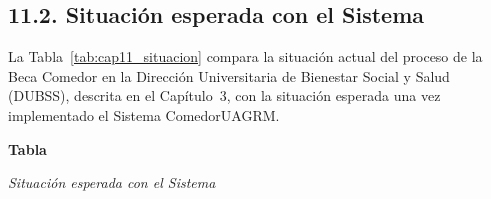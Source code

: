\subsection{11.2. Situación esperada con el Sistema}\label{sec:cap11_situacion}

La Tabla~\ref{tab:cap11_situacion} compara la situación actual del proceso de la Beca Comedor en la Dirección Universitaria de Bienestar Social y Salud (DUBSS), descrita en el Capítulo~3, con la situación esperada una vez implementado el Sistema ComedorUAGRM.

\label{tab:cap11_situacion}
\noindent\textbf{Tabla~\thetable}\par\nopagebreak
\noindent\textit{Situación esperada con el Sistema}\par\nopagebreak
\begingroup\footnotesize\linespread{1}\selectfont
\setlength{\LTleft}{0pt}\setlength{\LTright}{\fill}
